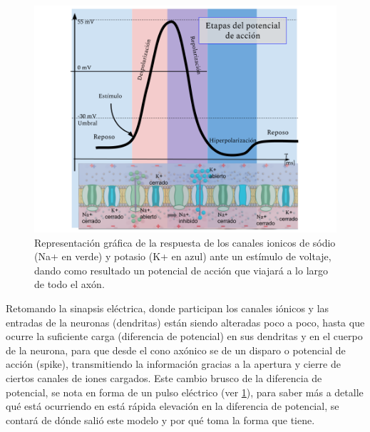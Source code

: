 \begin{figure}[h]
 \centering
 \includegraphics[scale=0.5]{../Figuras/Grafica.png}
 \caption{Representación gráfica de la respuesta de los canales ionicos de sódio (Na+ en verde) y potasio (K+ en azul) ante un estímulo de voltaje, dando como resultado un potencial de acción que viajará a lo largo de todo el axón.}
 \label{fig:graficaP}
\end{figure}

Retomando la sinapsis eléctrica, donde participan los canales iónicos y las entradas de la neuronas (dendritas) están siendo alteradas poco a poco, hasta que ocurre la suficiente carga (diferencia de potencial) en sus dendritas y en el cuerpo de la neurona, para que desde el cono axónico se de un disparo o potencial de acción (spike), transmitiendo la información gracias a la apertura y cierre de ciertos canales de iones cargados. Este cambio brusco de la diferencia de potencial, se nota en forma de un pulso eléctrico (ver \ref{fig:graficaP}),  para saber más a detalle qué está ocurriendo en está rápida elevación en la diferencia de potencial, se contará de dónde salió este modelo y por qué toma la forma que tiene. 

